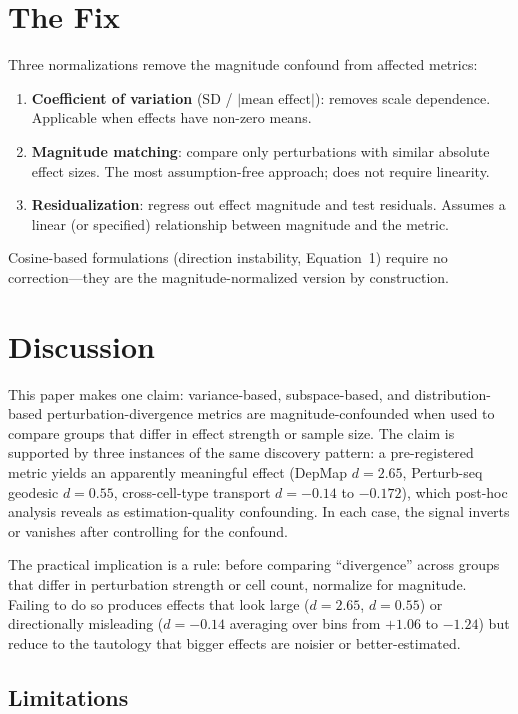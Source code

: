 \documentclass[11pt]{article}
\begin{document}
\section{The Fix}

Three normalizations remove the magnitude confound from affected
metrics:

\begin{enumerate}
  \item \textbf{Coefficient of variation} (SD / $|\text{mean effect}|$):
    removes scale dependence. Applicable when effects have non-zero means.
  \item \textbf{Magnitude matching}: compare only perturbations with
    similar absolute effect sizes. The most assumption-free approach; does
    not require linearity.
  \item \textbf{Residualization}: regress out effect magnitude and test
    residuals. Assumes a linear (or specified) relationship between
    magnitude and the metric.
\end{enumerate}

Cosine-based formulations (direction instability, Equation~1) require no
correction---they are the magnitude-normalized version by construction.

\section{Discussion}

This paper makes one claim: variance-based, subspace-based, and
distribution-based perturbation-divergence metrics are
magnitude-confounded when used to compare groups that differ in effect
strength or sample size. The claim is supported by three instances of
the same discovery pattern: a pre-registered metric yields an apparently
meaningful effect (DepMap $d = 2.65$, Perturb-seq geodesic $d = 0.55$,
cross-cell-type transport $d = -0.14$ to $-0.172$), which post-hoc
analysis reveals as estimation-quality confounding. In each case, the
signal inverts or vanishes after controlling for the confound.

The practical implication is a rule: before comparing ``divergence''
across groups that differ in perturbation strength or cell count,
normalize for magnitude. Failing to do so produces effects that look
large ($d = 2.65$, $d = 0.55$) or directionally misleading ($d = -0.14$
averaging over bins from $+1.06$ to $-1.24$) but reduce to the
tautology that bigger effects are noisier
or better-estimated.

\subsection{Limitations}
\end{document}
